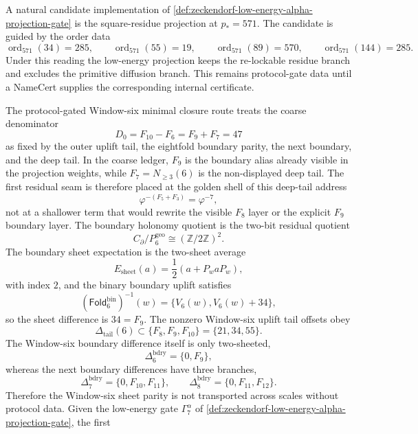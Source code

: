 \begin{principle}
\label{prin:zeckendorf-square-residue-gate-candidate}
A natural candidate implementation of
\autoref{def:zeckendorf-low-energy-alpha-projection-gate} is the
square-residue projection at \(p_\ast=571\). The candidate is guided by
the order data
$$
  \operatorname{ord}_{571}(34)=285,\qquad
  \operatorname{ord}_{571}(55)=19,\qquad
  \operatorname{ord}_{571}(89)=570,\qquad
  \operatorname{ord}_{571}(144)=285.
$$
Under this reading the low-energy projection keeps the re-lockable
residue branch and excludes the primitive diffusion branch. This remains
protocol-gate data until a NameCert supplies the corresponding internal
certificate.
\end{principle}

\begin{principle}
\label{prin:zeckendorf-protocol-gated-window-six-minimal-residual-closure}
The protocol-gated Window-six minimal closure route treats the coarse
denominator
$$
  D_0=F_{10}-F_6=F_9+F_7=47
$$
as fixed by the outer uplift tail, the eightfold boundary parity, the
next boundary, and the deep tail. In the coarse ledger, \(F_9\) is the
boundary alias already visible in the projection weights, while
\(F_7=N_{\geq 3}(6)\) is the non-displayed deep tail. The first residual
seam is therefore placed at the golden shell of this deep-tail address
$$
  \varphi^{-(F_5+F_3)}=\varphi^{-7},
$$
not at a shallower term that would rewrite the visible \(F_8\) layer or
the explicit \(F_9\) boundary layer. The boundary holonomy quotient is
the two-bit residual quotient
$$
  C_{\partial}/P_6^{\mathrm{geo}}\cong(\mathbb{Z}/2\mathbb{Z})^2.
$$
The boundary sheet expectation is the two-sheet average
$$
  E_{\mathrm{sheet}}(a)=\frac12(a+P_w aP_w),
$$
with index \(2\), and the binary boundary uplift satisfies
$$
  (\mathsf{Fold}^{\mathrm{bin}}_6)^{-1}(w)
  =
  \{V_6(w),V_6(w)+34\},
$$
so the sheet difference is \(34=F_9\). The nonzero Window-six uplift tail
offsets obey
$$
  \Delta_{\mathrm{tail}}(6)\subset\{F_8,F_9,F_{10}\}
  =
  \{21,34,55\}.
$$
The Window-six boundary difference itself is only two-sheeted,
$$
  \Delta^{\mathrm{bdry}}_6=\{0,F_9\},
$$
whereas the next boundary differences have three branches,
$$
  \Delta^{\mathrm{bdry}}_7=\{0,F_{10},F_{11}\},
  \qquad
  \Delta^{\mathrm{bdry}}_8=\{0,F_{11},F_{12}\}.
$$
Therefore the Window-six sheet parity is not transported across scales
without protocol data. Given the low-energy gate \(\Gamma^\alpha_7\) of
\autoref{def:zeckendorf-low-energy-alpha-projection-gate}, the first

\end{principle}
